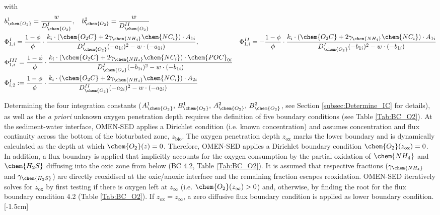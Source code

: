 \documentclass[gmd, manuscript]{copernicus}
\begin{document}
with 
\begin{align}
&b_{\chem{O_2}}^1 = \frac{w}{D_{\chem{O_2}}^{I}}, \quad b_{\chem{O_2}}^2 = \frac{w}{D_{\chem{O_2}}^{II}}\notag\\
&\Phi_{1,i}^I = \frac{1-\phi}{\phi}\cdot\frac{k_i\cdot(\chem{O_2C}+2 \gamma_{\chem{NH_4}} \chem{NC_i})\cdot A_{1i}}{D_{\chem{O_2}}^{I}(-a_{1i})^2-w\cdot (-a_{1i})}, &\Phi_{1,i}^{II} = - \frac{1-\phi}{\phi}\cdot\frac{k_i\cdot(\chem{O_2C}+2 \gamma_{\chem{NH_4}} \chem{NC_i})\cdot A_{1i}}{D_{\chem{O_2}}^{I}(-b_{1i})^2-w\cdot (-b_{1i})}\notag\\
&\Phi_{1,i}^{III} = \frac{1-\phi}{\phi}\cdot\frac{k_i\cdot(\chem{O_2C}+2 \gamma_{\chem{NH_4}} \chem{NC_i})\cdot \chem{POC}_{0i}}{D_{\chem{O_2}}^{I}(-b_{1i})^2-w\cdot (-b_{1i})} \notag\\
&\Phi_{i,2}^I := \frac{1-\phi}{\phi}\cdot\frac{k_i\cdot(\chem{O_2C}+2 \gamma_{\chem{NH_4}} \chem{NC_i})\cdot A_{2i}}{D_{\chem{O_2}}^{II}(-a_{2i})^2-w\cdot (-a_{2i})} \notag
\end{align}

Determining the four integration constants ($A_{\chem{O_2}}^1,\, B_{\chem{O_2}}^1,\, A_{\chem{O_2}}^2,\, B_{\chem{O_2}}^2$, see Section \ref{subsec:Determine_IC} for details), as well as the \textit{a priori} unknown oxygen penetration 
depth requires the definition of five boundary conditions (see Table \ref{Tab:BC_O2}). 
At the sediment-water interface, OMEN-SED applies a Dirichlet condition (i.e. known concentration) and assumes concentration and flux continuity across the bottom of the bioturbated zone, $z_{\mathrm{bio}}$. 
The oxygen penetration depth $z_{\mathrm{ox}}$ marks the lower boundary and is dynamically calculated as the depth at which $\chem{O_2}(z)=0$. 
Therefore, OMEN-SED applies a Dirichlet boundary condition $\chem{O_2}(z_{\mathrm{ox}})=0$. In addition, a flux boundary is applied that implicitly accounts for the oxygen consumption by the partial oxidation 
of $\chem{NH_4}$ and $\chem{H_2S}$ diffusing into the oxic zone from below (BC 4.2, Table \ref{Tab:BC_O2}). It is assumed that respective fractions ($\gamma_{\chem{NH_4}}$ and $\gamma_{\chem{H_2S}}$) are directly reoxidised 
at the oxic/anoxic interface and the remaining fraction escapes reoxidation. OMEN-SED iteratively solves for $z_{\mathrm{ox}}$ by first testing if there is oxygen left at $z_\infty$ (i.e. $\chem{O_2}(z_\infty) > 0$) and, otherwise, by finding the root for the flux 
boundary condition 4.2 (Table \ref{Tab:BC_O2}). If $z_{\mathrm{ox}}=z_\infty$,  a zero diffusive flux boundary condition is applied as lower boundary condition. 
[-1.5cm]%
\end{document}
